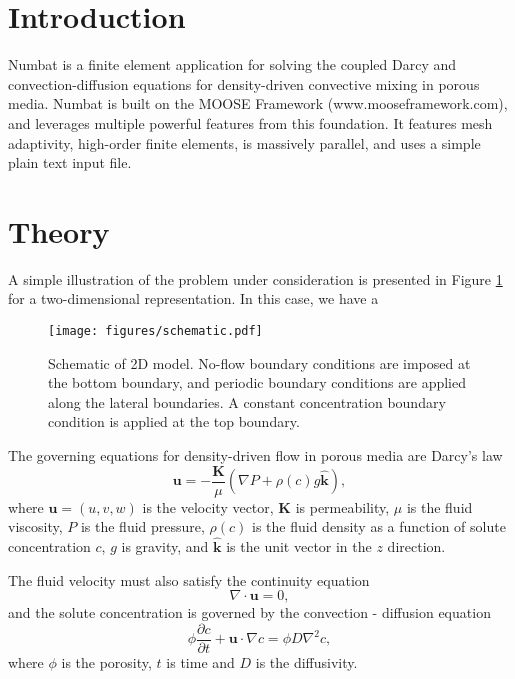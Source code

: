 \documentclass[11pt, a4paper]{csiroreport2012}
\begin{document}
\section{Introduction}

Numbat is a finite element application for solving the coupled Darcy and convection-diffusion equations for density-driven convective mixing in porous media. Numbat is built on the MOOSE Framework (www.mooseframework.com), and leverages multiple powerful features from this foundation. It features mesh adaptivity, high-order finite elements, is massively parallel, and uses a simple plain text input file. 

\section{Theory}

A simple illustration of the problem under consideration is presented in Figure \ref{fig:schematic} for a two-dimensional representation. In this case, we have a 
\begin{figure}[ht]
\begin{center}
\texttt{[image: figures/schematic.pdf]}
\caption{Schematic of 2D model. No-flow boundary conditions are imposed at the bottom boundary, and periodic boundary conditions are applied along the lateral boundaries. A constant concentration boundary condition is applied at the top boundary.}
\label{fig:schematic}
\end{center}
\end{figure}

The governing equations for density-driven flow in porous media are Darcy's law
\begin{equation}
\mathbf{u} = - \frac{\mathbf{K}}{\mu} \left(\nabla P + \rho(c) g \hat{\mathbf{k}} \right),
\label{eq:darcy}
\end{equation}
where $\mathbf{u} = (u, v, w)$ is the velocity vector, $\mathbf{K}$ is permeability, $\mu$ is the fluid viscosity, $P$ is the fluid pressure, $\rho(c)$ is the fluid density as a function of solute concentration $c$, $g$ is gravity, and $\hat{\mathbf{k}}$ is the unit vector in the $z$ direction.

The fluid velocity must also satisfy the continuity equation
\begin{equation}
\nabla \cdot \mathbf{u} = 0,
\end{equation}
and the solute concentration is governed by the convection - diffusion equation
\begin{equation}
\phi \frac{\partial c}{\partial t} + \mathbf{u} \cdot \nabla c = \phi D \nabla^2 c,
\label{eq:convdiff}
\end{equation}
where $\phi$ is the porosity, $t$ is time and $D$ is the diffusivity. 
\end{document}
